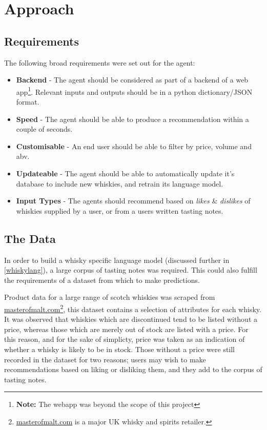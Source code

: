 \section{Approach}\label{sec:approach}
\subsection{Requirements}
The following broad requirements were set out for the agent:
\begin{itemize}
    \item \textbf{Backend} - The agent should be considered as part of
    a backend of a web app\footnote{\textbf{Note:} The webapp was beyond the scope
    of this project}. Relevant inputs and outputs should be in a python
    dictionary/JSON format.
    \item \textbf{Speed} - The agent should be able to produce a recommendation
    within a couple of seconds.
    \item \textbf{Customisable} - An end user should be able to filter by price,
    volume and abv.
    \item \textbf{Updateable} - The agent should be able to automatically update
    it's database to include new whiskies, and retrain its language model.
    \item \textbf{Input Types} - The agents should recommend based on \emph{likes} 
    \& \emph{dislikes} of whiskies supplied by a user, or from a users written 
    tasting notes.
\end{itemize}

\subsection{The Data}
In order to build a whisky specific language model (discussed further in
\autoref{whiskylang}), a large corpus of tasting notes was required. This could
also fulfill the requirements of a dataset from which to make predictions.

Product data for a large range of scotch whiskies was scraped from
\href{http://masterofmalt.com/}{masterofmalt.com}\footnote{\href{
http://masterofmalt.com/}{masterofmalt.com} is a major UK whisky 
and spirits retailer.}, this dataset contains a selection of attributes for each 
whisky.  It was observed that whiskies which are discontinued tend to be listed
without a price, whereas those which are merely out of stock are listed with a
price.  For this reason, and for the sake of simplicty, price was taken as an
indication of whether a whisky is likely to be in stock.  Those without a price
were still recorded in the dataset for two reasons; users may wish to make recommendations
based on liking or disliking them, and they add to the corpus of tasting notes.

